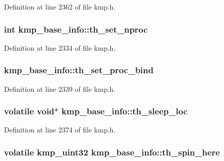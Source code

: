 Definition at line 2362 of file kmp.\-h.

\hypertarget{structkmp__base__info_a0bd099be9aa241334bdfad0f92789bee}{
\subsubsection[{th\-\_\-set\-\_\-nproc}]{ {\bf int} kmp\-\_\-base\-\_\-info\-::th\-\_\-set\-\_\-nproc}}\label{structkmp__base__info_a0bd099be9aa241334bdfad0f92789bee}


Definition at line 2334 of file kmp.\-h.

\hypertarget{structkmp__base__info_ae85fa12e3aa227e4c734047fe2cadedd}{
\subsubsection[{th\-\_\-set\-\_\-proc\-\_\-bind}]{ kmp\-\_\-base\-\_\-info\-::th\-\_\-set\-\_\-proc\-\_\-bind}}\label{structkmp__base__info_ae85fa12e3aa227e4c734047fe2cadedd}


Definition at line 2339 of file kmp.\-h.

\hypertarget{structkmp__base__info_ab8cdb45ccd6ce5afbebc735e740ed521}{
\subsubsection[{th\-\_\-sleep\-\_\-loc}]{\setlength{\rightskip}{0pt plus 5cm}volatile {\bf void}$\ast$ kmp\-\_\-base\-\_\-info\-::th\-\_\-sleep\-\_\-loc}}\label{structkmp__base__info_ab8cdb45ccd6ce5afbebc735e740ed521}


Definition at line 2374 of file kmp.\-h.

\hypertarget{structkmp__base__info_ab939b611f51b7e2c41d24682469d830b}{
\subsubsection[{th\-\_\-spin\-\_\-here}]{\setlength{\rightskip}{0pt plus 5cm}volatile kmp\-\_\-uint32 kmp\-\_\-base\-\_\-info\-::th\-\_\-spin\-\_\-here}}\label{structkmp__base__info_ab939b611f51b7e2c41d24682469d830b}


